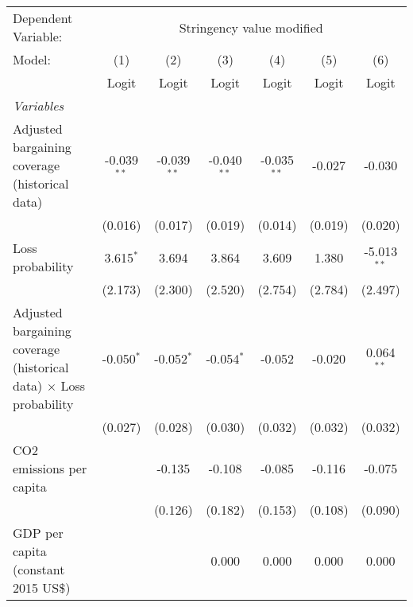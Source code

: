 
\begingroup
\centering
\begin{tabular}{lcccccc}
   \toprule
   Dependent Variable: & \multicolumn{6}{c}{Stringency value modified}\\
   Model:                                                                    & (1)           & (2)           & (3)           & (4)           & (5)           & (6)\\  
                                                                             &  Logit        & Logit         & Logit         & Logit         & Logit         & Logit\\  
   \midrule
   \emph{Variables}\\
   Adjusted bargaining coverage (historical data)                            & -0.039$^{**}$ & -0.039$^{**}$ & -0.040$^{**}$ & -0.035$^{**}$ & -0.027        & -0.030\\   
                                                                             & (0.016)       & (0.017)       & (0.019)       & (0.014)       & (0.019)       & (0.020)\\   
   Loss probability                                                          & 3.615$^{*}$   & 3.694         & 3.864         & 3.609         & 1.380         & -5.013$^{**}$\\   
                                                                             & (2.173)       & (2.300)       & (2.520)       & (2.754)       & (2.784)       & (2.497)\\   
   Adjusted bargaining coverage (historical data) $\times$ Loss probability  & -0.050$^{*}$  & -0.052$^{*}$  & -0.054$^{*}$  & -0.052        & -0.020        & 0.064$^{**}$\\   
                                                                             & (0.027)       & (0.028)       & (0.030)       & (0.032)       & (0.032)       & (0.032)\\   
   CO2 emissions per capita                                                  &               & -0.135        & -0.108        & -0.085        & -0.116        & -0.075\\   
                                                                             &               & (0.126)       & (0.182)       & (0.153)       & (0.108)       & (0.090)\\   
   GDP per capita (constant 2015 US\$)                                       &               &               & 0.000         & 0.000         & 0.000         & 0.000\\   

\end{tabular}
